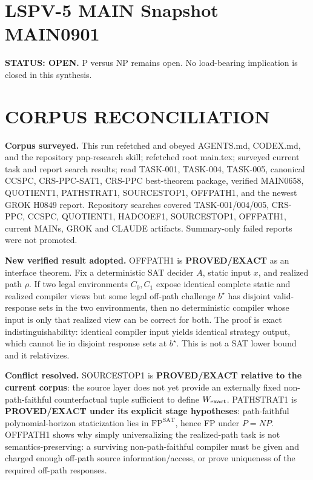 \documentclass[11pt]{article}
\begin{document}
\section*{LSPV-5 MAIN Snapshot MAIN0901}
\textbf{STATUS: OPEN.} P versus NP remains open. No load-bearing implication is closed in this synthesis.

\section*{CORPUS RECONCILIATION}
\textbf{Corpus surveyed.}
This run refetched and obeyed AGENTS.md, CODEX.md, and the repository pnp-research skill; refetched root main.tex; surveyed current task and report search results; read TASK-001, TASK-004, TASK-005, canonical CCSPC, CRS-PPC-SAT1, CRS-PPC best-theorem package, verified MAIN0658, QUOTIENT1, PATHSTRAT1, SOURCESTOP1, OFFPATH1, and the newest GROK H0849 report. Repository searches covered TASK-001/004/005, CRS-PPC, CCSPC, QUOTIENT1, HADCOEF1, SOURCESTOP1, OFFPATH1, current MAINs, GROK and CLAUDE artifacts. Summary-only failed reports were not promoted.

\textbf{New verified result adopted.}
OFFPATH1 is \textbf{PROVED/EXACT} as an interface theorem. Fix a deterministic SAT decider \(A\), static input \(x\), and realized path \(\rho\). If two legal environments \(C_0,C_1\) expose identical complete static and realized compiler views but some legal off-path challenge \(b^\star\) has disjoint valid-response sets in the two environments, then no deterministic compiler whose input is only that realized view can be correct for both. The proof is exact indistinguishability: identical compiler input yields identical strategy output, which cannot lie in disjoint response sets at \(b^\star\). This is not a SAT lower bound and it relativizes.

\textbf{Conflict resolved.}
SOURCESTOP1 is \textbf{PROVED/EXACT relative to the current corpus}: the source layer does not yet provide an externally fixed non-path-faithful counterfactual tuple sufficient to define \(W_{\rm exact}\). PATHSTRAT1 is \textbf{PROVED/EXACT under its explicit stage hypotheses}: path-faithful polynomial-horizon staticization lies in \(\mathrm{FP}^{\mathrm{SAT}}\), hence FP under \(P=NP\). OFFPATH1 shows why simply universalizing the realized-path task is not semantics-preserving: a surviving non-path-faithful compiler must be given and charged enough off-path source information/access, or prove uniqueness of the required off-path responses.
\end{document}
